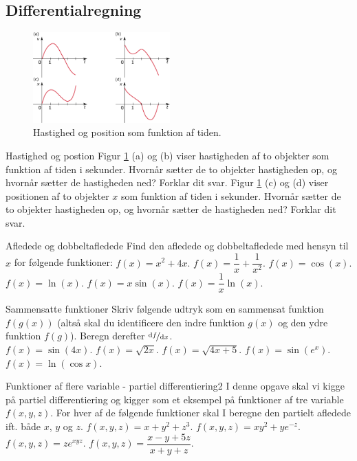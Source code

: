 \subsection*{Differentialregning}
    \begin{figure}[H]
		\centering
		\includegraphics[width=0.47\textwidth]{Matematik/matfig/vx_grafer.eps}
		\caption{Hastighed og position som funktion af tiden.}
		\label{fig:vx_grafer}
	\end{figure}
\begin{opgave}[1]{Hastighed og postion}
	\opg Figur \ref{fig:vx_grafer} (a) og (b) viser hastigheden af to objekter som funktion af tiden i sekunder. Hvornår sætter de to objekter hastigheden op, og hvornår sætter de hastigheden ned? Forklar dit svar.
	\opg Figur \ref{fig:vx_grafer} (c) og (d) viser positionen af to objekter $x$ som funktion af tiden i sekunder. Hvornår sætter de to objekter hastigheden op, og hvornår sætter de hastigheden ned? Forklar dit svar.
\end{opgave}
\begin{opgave}[2]{Afledede og dobbeltafledede}
Find den afledede og dobbeltafledede med hensyn til $x$ for følgende funktioner:
\opg $f(x) = x^2 + 4x.$
\opg $f(x) = \dfrac{1}{x} + \dfrac{1}{x^2}.$
\opg $f(x) = \cos(x).$
\opg $f(x) = \ln(x).$
\opg $f(x) = x \sin(x).$
\opg $f(x) = \dfrac{1}{x} \ln(x).$
\end{opgave}
\begin{opgave}[2]{Sammensatte funktioner}
Skriv følgende udtryk som en sammensat funktion $f(g(x))$ (altså skal du identificere den indre funktion $g(x)$ og den ydre funktion $f(g)$). Beregn derefter $\nicefrac{\dd f}{\dd x}$.\\ 
\opg $f(x) = \sin (4x).$
\opg $f(x) = \sqrt{2x}.$
\opg $f(x) = \sqrt{4x+5}.$
\opg $f(x) = \sin(e^x).$
\opg $f(x) =  \ln \left( \cos x \right).$
\end{opgave}
\begin{opgave}[3]{Funktioner af flere variable - partiel differentiering}{2}
I denne opgave skal vi kigge på partiel differentiering og kigger som et eksempel på funktioner af tre variable $f(x,y,z)$. For hver af de følgende funktioner skal I beregne den partielt afledede ift. både $x$, $y$ og $z$.
\opg $f(x,y,z) = x +y^2 + z^3.$
\opg $f(x,y,z) = x y^2 +  ye^{-z}.$
\opg $f(x,y,z) = ze^{xyz}.$
\opg $f(x,y,z) = \dfrac{x-y+5z}{x+y+z}.$ \\
\end{opgave}
